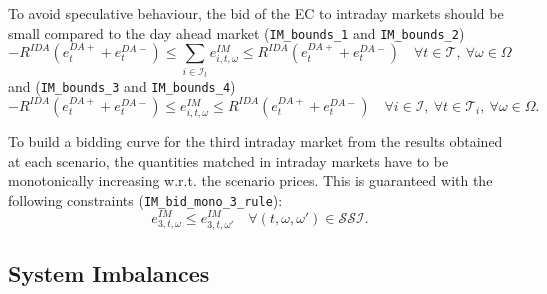 \documentclass{article}
\begin{document}
To avoid speculative behaviour, the bid of the EC to intraday markets should be small compared to the day ahead market (\verb|IM_bounds_1| and \verb|IM_bounds_2|)
\begin{equation} \label{EQ:DM_IM_1}
	-R^{IDA} (e^{DA+}_{t} + e^{DA-}_{t})  \leq \sum_{i \in \mathcal{I}_t} e^{IM}_{i, t, \omega} \leq R^{IDA} (e^{DA+}_{t} + e^{DA-}_{t}) \quad \forall t \in \mathcal{T}, \ \forall \omega \in \Omega
\end{equation}
and (\verb|IM_bounds_3| and \verb|IM_bounds_4|)
\begin{equation} \label{EQ:IM_bounds_3-4}
	-R^{IDA} (e^{DA+}_{t} + e^{DA-}_{t}) \leq e^{IM}_{i, t, \omega} \leq R^{IDA} (e^{DA+}_{t} + e^{DA-}_{t}) \quad \forall i \in \mathcal{I}, \ \forall t \in \mathcal{T}_i, \ \forall \omega \in \Omega.
\end{equation}

To build a bidding curve for the third intraday market from the results obtained at each scenario, the quantities matched in intraday markets have to be monotonically increasing w.r.t. the scenario prices. This is guaranteed with the following constraints (\verb|IM_bid_mono_3_rule|):
\begin{equation} \label{EQ:lI_bid}
	e^{IM}_{3, t, \omega} \leq e^{IM}_{3, t, \omega'} \quad \forall (t, \omega, \omega') \in \mathcal{SSI}.
\end{equation}

\subsection{System Imbalances}
\end{document}

